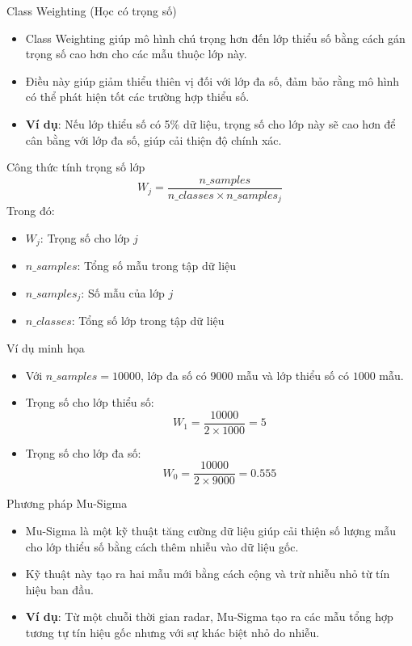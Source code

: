\documentclass{beamer}
\begin{document}
\begin{frame}{Class Weighting (Học có trọng số)}
    \begin{itemize}
        \item Class Weighting giúp mô hình chú trọng hơn đến lớp thiểu số bằng cách gán trọng số cao hơn cho các mẫu thuộc lớp này.
        \item Điều này giúp giảm thiểu thiên vị đối với lớp đa số, đảm bảo rằng mô hình có thể phát hiện tốt các trường hợp thiểu số.
        \item \textbf{Ví dụ}: Nếu lớp thiểu số có 5\% dữ liệu, trọng số cho lớp này sẽ cao hơn để cân bằng với lớp đa số, giúp cải thiện độ chính xác.
    \end{itemize}
\end{frame}

\begin{frame}{Công thức tính trọng số lớp}
    \begin{equation}
    W_j = \frac{n\_samples}{n\_classes \times n\_samples_j}
    \end{equation}
    Trong đó:
    \begin{itemize}
        \item $W_j$: Trọng số cho lớp $j$
        \item $n\_samples$: Tổng số mẫu trong tập dữ liệu
        \item $n\_samples_j$: Số mẫu của lớp $j$
        \item $n\_classes$: Tổng số lớp trong tập dữ liệu
    \end{itemize}
\end{frame}

\begin{frame}{Ví dụ minh họa}
    \begin{itemize}
        \item Với $n\_samples = 10000$, lớp đa số có $9000$ mẫu và lớp thiểu số có $1000$ mẫu.
        \item Trọng số cho lớp thiểu số:
        \[
        W_1 = \frac{10000}{2 \times 1000} = 5
        \]
        \item Trọng số cho lớp đa số:
        \[
        W_0 = \frac{10000}{2 \times 9000} = 0.555
        \]
    \end{itemize}
\end{frame}

\begin{frame}{Phương pháp Mu-Sigma}
    \begin{itemize}
        \item Mu-Sigma là một kỹ thuật tăng cường dữ liệu giúp cải thiện số lượng mẫu cho lớp thiểu số bằng cách thêm nhiễu vào dữ liệu gốc.
        \item Kỹ thuật này tạo ra hai mẫu mới bằng cách cộng và trừ nhiễu nhỏ từ tín hiệu ban đầu.
        \item \textbf{Ví dụ}: Từ một chuỗi thời gian radar, Mu-Sigma tạo ra các mẫu tổng hợp tương tự tín hiệu gốc nhưng với sự khác biệt nhỏ do nhiễu.
    \end{itemize}
\end{frame}
\end{document}
